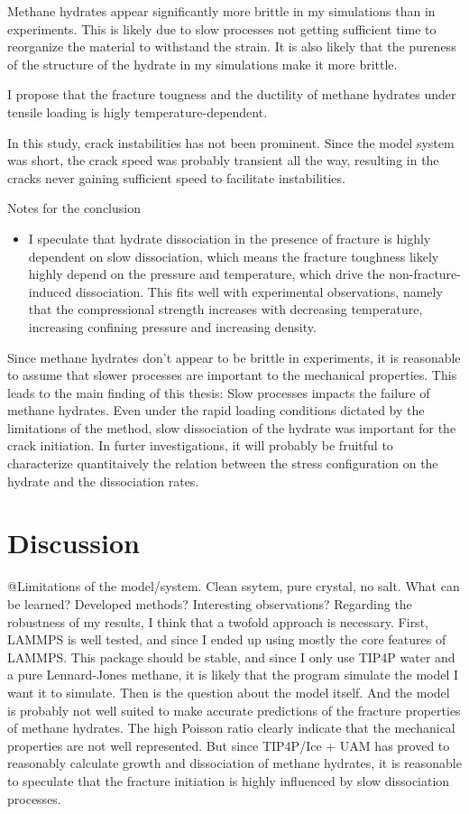 Methane hydrates appear significantly more brittle in my simulations than in experiments. This is likely due to slow processes not getting sufficient time to reorganize the material to withstand the strain. It is also likely that the pureness of the structure of the hydrate in my simulations make it more brittle.

I propose that the fracture tougness and the ductility of methane hydrates under tensile loading is higly temperature-dependent.

In this study, crack instabilities has not been prominent. Since the model system was short, the crack speed was probably transient all the way, resulting in the cracks never gaining sufficient speed to facilitate instabilities.	

Notes for the conclusion
\begin{itemize}
\item I speculate that hydrate dissociation in the presence of fracture is highly dependent on slow dissociation, which means the fracture toughness likely highly depend on the pressure and temperature, which drive the non-fracture-induced dissociation. This fits well with experimental observations, namely that the compressional strength increases with decreasing temperature, increasing confining pressure and increasing density.
\end{itemize}

Since methane hydrates don't appear to be brittle in experiments, it is reasonable to assume that slower processes are important to the mechanical properties. This leads to the main finding of this thesis: Slow processes impacts the failure of methane hydrates. Even under the rapid loading conditions dictated by the limitations of the method, slow dissociation of the hydrate was important for the crack initiation.
%
In furter investigations, it will probably be fruitful to characterize quantitaively the relation between the stress configuration on the hydrate and the dissociation rates. 

\section{Discussion}
@Limitations of the model/system. Clean ssytem, pure crystal, no salt. What can be learned? Developed methods? Interesting observations? 
Regarding the robustness of my results, I think that a twofold approach is necessary. First, LAMMPS is well tested, and since I ended up using mostly the core features of LAMMPS. This package should be stable, and since I only use TIP4P water and a pure Lennard-Jones methane, it is likely that the program simulate the model I want it to simulate. Then is the question about the model itself. And the model is probably not well suited to make accurate predictions of the fracture properties of methane hydrates. The high Poisson ratio clearly indicate that the mechanical properties are not well represented. But since TIP4P/Ice + UAM has proved to reasonably calculate growth and dissociation of methane hydrates, it is reasonable to speculate that the fracture initiation is highly influenced by slow dissociation processes. 

